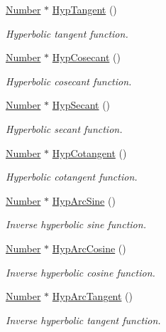 \begin{DoxyCompactItemize}
\hyperlink{structNumber}{Number} $\ast$ \hyperlink{structRealNumber_a867a59eb450583c6adf7d35206f18001}{Hyp\+Tangent} ()
\begin{DoxyCompactList}\small\item\em Hyperbolic tangent function. \end{DoxyCompactList}\item 
\hyperlink{structNumber}{Number} $\ast$ \hyperlink{structRealNumber_a540b460d8e9c611b37ce00b2e32fc7f1}{Hyp\+Cosecant} ()
\begin{DoxyCompactList}\small\item\em Hyperbolic cosecant function. \end{DoxyCompactList}\item 
\hyperlink{structNumber}{Number} $\ast$ \hyperlink{structRealNumber_a9daeb349df78593a4747f417300cf68b}{Hyp\+Secant} ()
\begin{DoxyCompactList}\small\item\em Hyperbolic secant function. \end{DoxyCompactList}\item 
\hyperlink{structNumber}{Number} $\ast$ \hyperlink{structRealNumber_a82ad5a573ac31bd03829ed0e39bde26d}{Hyp\+Cotangent} ()
\begin{DoxyCompactList}\small\item\em Hyperbolic cotangent function. \end{DoxyCompactList}\item 
\hyperlink{structNumber}{Number} $\ast$ \hyperlink{structRealNumber_a304a0afc690e5378aef03aa3d76425a2}{Hyp\+Arc\+Sine} ()
\begin{DoxyCompactList}\small\item\em Inverse hyperbolic sine function. \end{DoxyCompactList}\item 
\hyperlink{structNumber}{Number} $\ast$ \hyperlink{structRealNumber_a180b1d26d19c53070014c9540ca058a9}{Hyp\+Arc\+Cosine} ()
\begin{DoxyCompactList}\small\item\em Inverse hyperbolic cosine function. \end{DoxyCompactList}\item 
\hyperlink{structNumber}{Number} $\ast$ \hyperlink{structRealNumber_a62836390c7edc73ecea5c7455dd04afe}{Hyp\+Arc\+Tangent} ()
\begin{DoxyCompactList}\small\item\em Inverse hyperbolic tangent function. \end{DoxyCompactList}\item 

\end{DoxyCompactItemize}
